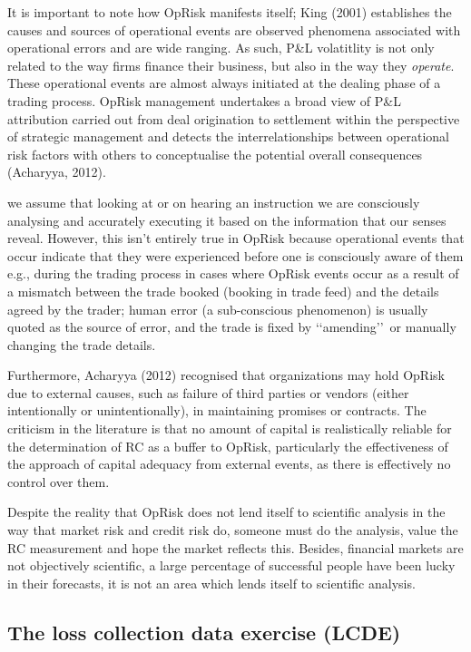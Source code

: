 \documentclass[]{DissertateUSU}
\begin{document}
It is important to note how OpRisk manifests itself; King (2001)
establishes the causes and sources of operational events are observed
phenomena associated with operational errors and are wide ranging. As
such, P\&L volatitlity is not only related to the way firms finance
their business, but also in the way they \emph{operate}. These
operational events are almost always initiated at the dealing phase of a
trading process. OpRisk management undertakes a broad view of P\&L
attribution carried out from deal origination to settlement within the
perspective of strategic management and detects the interrelationships
between operational risk factors with others to conceptualise the
potential overall consequences (Acharyya, 2012).\medskip

we assume that looking at or on hearing an instruction we are
consciously analysing and accurately executing it based on the
information that our senses reveal. However, this isn't entirely true in
OpRisk because operational events that occur indicate that they were
experienced before one is consciously aware of them e.g., during the
trading process in cases where OpRisk events occur as a result of a
mismatch between the trade booked (booking in trade feed) and the
details agreed by the trader; human error (a sub-conscious phenomenon)
is usually quoted as the source of error, and the trade is fixed by
\lq\lq amending\rq\rq~or manually changing the trade details. \medskip

Furthermore, Acharyya (2012) recognised that organizations may hold
OpRisk due to external causes, such as failure of third parties or
vendors (either intentionally or unintentionally), in maintaining
promises or contracts. The criticism in the literature is that no amount
of capital is realistically reliable for the determination of RC as a
buffer to OpRisk, particularly the effectiveness of the approach of
capital adequacy from external events, as there is effectively no
control over them.\medskip

Despite the reality that OpRisk does not lend itself to scientific
analysis in the way that market risk and credit risk do, someone must do
the analysis, value the RC measurement and hope the market reflects
this. Besides, financial markets are not objectively scientific, a large
percentage of successful people have been lucky in their forecasts, it
is not an area which lends itself to scientific analysis.

\subsection{The loss collection data exercise (LCDE)}
\label{ssec:The loss collection data exercise (LCDE)}
\end{document}
